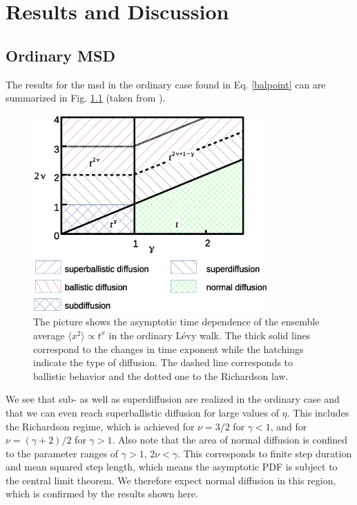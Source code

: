 \chapter{Results and Discussion}

\section{Ordinary MSD}



The results for the \gls{msd} in the ordinary case found in Eq. \ref{balpoint} can are summarized in Fig. \ref{fig:resultsMSDordinary} (taken from 
\cite{bothe}).

\begin{figure}[h!]
\begin{center}
\includegraphics[width=90mm]{pics/resultsMSDordinary.eps}
\caption{The picture shows the asymptotic time dependence of the ensemble average $\langle x^2 \rangle \propto t^{x}$ in the ordinary L\'evy walk. The thick solid lines correspond to the changes in time exponent while the hatchings indicate the type of diffusion. The dashed line corresponds to ballistic behavior and the dotted one to the Richardson law.
\label{fig:resultsMSDordinary} }
\end{center}
\end{figure} 

We see that sub- as well as superdiffusion are realized in the ordinary case and that we can even reach superballistic diffusion for large values of $\eta$. This includes the Richardson regime, which is achieved for $\nu = 3/2$ for $\gamma <1$, and for $\nu = (\gamma + 2)/2$ for $\gamma > 1$. Also note that the area of normal diffusion is confined to the parameter ranges of $\gamma>1$, $2\nu < \gamma$. This corresponds to finite step duration and mean squared step length, which means the asymptotic \gls{PDF} is subject to the central limit theorem. We therefore expect normal diffusion in this region, which is confirmed by the results shown here.

